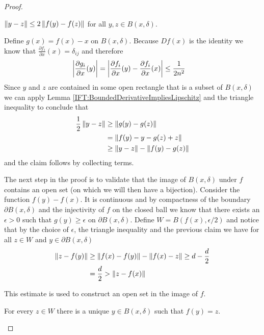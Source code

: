 \begin{proof}
\begin{clm}$\left \lVert y - z \right \rVert
\leq 2 \left \lVert f(y) - f(z) \right \rVert$ for all $y,z \in B(x, \delta)$.
\end{clm}

Define $g(x) = f(x) - x$ on $B(x, \delta)$.  Because $Df(x)$ is the
identity we know that $\frac{\partial f_i}{\partial x}(x) =
\delta_{ij}$ and therefore 
\begin{align*}
\left \vert \frac{\partial g_i}{\partial x}(y) \right \vert &=
\left \vert \frac{\partial f_i}{\partial x}(y) - \frac{\partial f_i}{\partial
                                           x}(x) \right \vert 
\leq \frac{1}{2n^2}
\end{align*}
Since $y$ and $z$ are contained in some open rectangle that is a
subset of $B(x,\delta)$ we can apply Lemma \ref{IFT:BoundedDerivativeImpliesLipschitz} and the
triangle inequality to
conclude that 
\begin{align*}
\frac{1}{2} \left \lVert y - z \right \rVert &\geq \left \lVert g(y) - g(z) \right \rVert \\
&=\left \lVert f(y) - y - g(z) + z \right \rVert \\
&\geq \left \lVert y - z \right \rVert - \left \lVert f(y) - g(z) \right \rVert
\end{align*}
and the claim follows by collecting terms.

The next step in the proof is to validate that the image of $B(x,
\delta)$ under $f$ contains an open set (on which we will then have a
bijection).  Consider the function $f(y) - f(x)$.  It is
continuous and by compactness of the boundary $\partial B(x,\delta)$
and the injectivity of $f$ on the closed ball we know that there
exists an $\epsilon > 0$ such that $g(y) \geq \epsilon$ on $\partial
B(x,\delta)$.  Define $W = B(f(x), \epsilon/2)$ and notice that by the
choice of $\epsilon$, the triangle inequality and the previous claim
we have for all $z \in W$ and $y \in \partial B(x, \delta)$
\begin{align}
\left \lVert z - f(y) \right \rVert &\geq \left \lVert f(x) - f(y) \right \rVert - \left \lVert f(x) - z \right \rVert \geq d -
                  \frac{d}{2} \\
&= \frac{d}{2} > \left \lVert z - f(x) \right \rVert
\end{align}\label{IFT:InteriorMinimumEstimate}

This estimate is used to construct an open set in the image of $f$.

\begin{clm}For every $z \in W$ there is a unique $y \in B(x, \delta)$ such
that $f(y) = z$.
\end{clm}


\end{proof}
